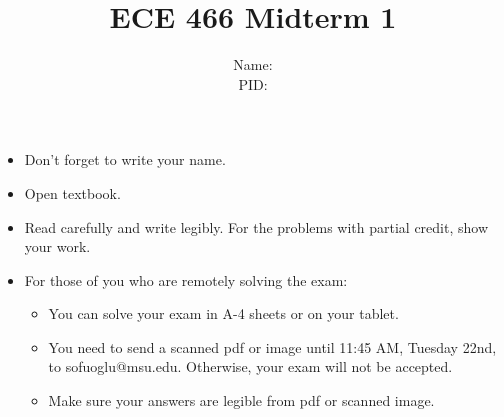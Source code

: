 \documentclass{article}
\begin{document}
 
\title{ECE 466 Midterm 1}
\author{Name: \\PID: }
 
\maketitle
 
\begin{itemize}
    \item Don't forget to write your name.
    \item Open textbook.
    \item Read carefully and write legibly. For the problems with partial credit, show your work.
    \item For those of you who are remotely solving the exam: 
    \begin{itemize}
        \item You can solve your exam in A-4 sheets or on your tablet.
        \item You need to send a scanned pdf or image until 11:45 AM, Tuesday 22nd, to sofuoglu@msu.edu. Otherwise, your exam will not be accepted.
        \item Make sure your answers are legible from pdf or scanned image. 
    \end{itemize}
\end{itemize}
\end{document}
